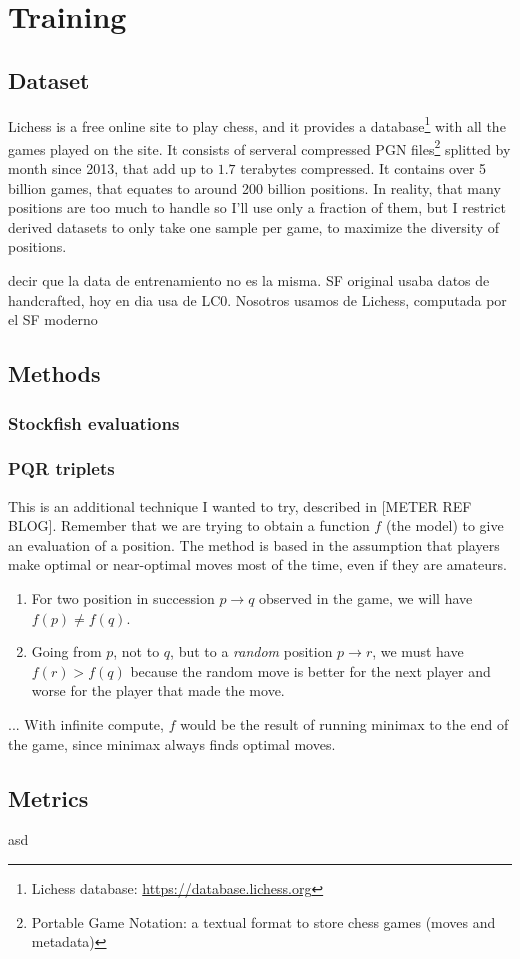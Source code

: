 
\section{Training}

\subsection{Dataset}

Lichess is a free online site to play chess, and it provides a database\footnote[1]{Lichess database: \url{https://database.lichess.org}} with all the games played on the site. It consists of serveral compressed PGN files\footnote[2]{Portable Game Notation: a textual format to store chess games (moves and metadata)} splitted by month since 2013, that add up to $1.7$ terabytes compressed. It contains over 5 billion games, that equates to around 200 billion positions. In reality, that many positions are too much to handle so I'll use only a fraction of them, but I restrict derived datasets to only take one sample per game, to maximize the diversity of positions.


decir que la data de entrenamiento no es la misma. SF original usaba datos de handcrafted, hoy en dia usa de LC0. Nosotros usamos de Lichess, computada por el SF moderno

\subsection{Methods}



\subsubsection{Stockfish evaluations}


\subsubsection{PQR triplets}

This is an additional technique I wanted to try, described in [METER REF BLOG]. Remember that we are trying to obtain a function $f$ (the model) to give an evaluation of a position. The method is based in the assumption that players make optimal or near-optimal moves most of the time, even if they are amateurs.

\begin{enumerate}
\item For two position in succession $p \rightarrow q$  observed in the game, we will have $f(p) \neq f(q)$.
\item Going from $p$, not to $q$, but to a \textit{random} position $p \rightarrow r$, we must have $f(r) > f(q)$ because the random move is better for the next player and worse for the player that made the move.
\end{enumerate}


... With infinite compute, $f$ would be the result of running minimax to the end of the game, since minimax always finds optimal moves.

\subsection{Metrics}

asd \cite{nnue:2018}
